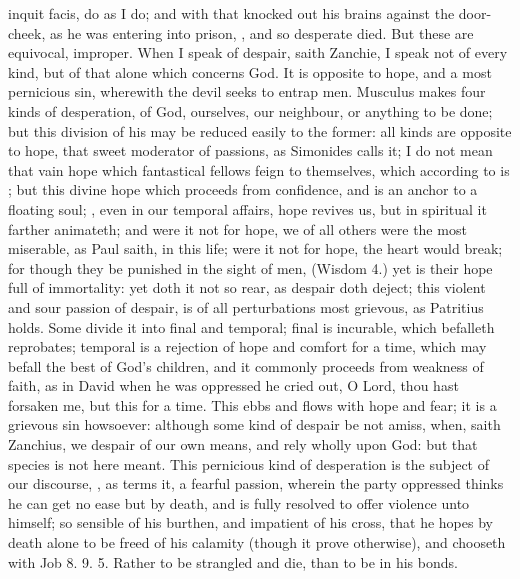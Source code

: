 {{inquit facis}, do as I do; and with that knocked out his brains against
the door-cheek, as he was entering into prison, , and so
desperate died. But these are equivocal, improper. When I speak of
despair, saith Zanchie, I speak not of every kind, but of that
alone which concerns God. It is opposite to hope, and a most pernicious
sin, wherewith the devil seeks to entrap men. Musculus makes four kinds
of desperation, of God, ourselves, our neighbour, or anything to be
done; but this division of his may be reduced easily to the former: all
kinds are opposite to hope, that sweet moderator of passions, as
Simonides calls it; I do not mean that vain hope which fantastical
fellows feign to themselves, which according to \Aristotle{} is ; but this divine hope which proceeds from
confidence, and is an anchor to a floating soul; ,
even in our temporal affairs, hope revives us, but in spiritual it
farther animateth; and were it not for hope, we of all others were the
most miserable, as Paul saith, in this life; were it not for hope, the
heart would break; for though they be punished in the sight of men,
(Wisdom  4.) yet is their hope full of immortality: yet doth it not
so rear, as despair doth deject; this violent and sour passion of
despair, is of all perturbations most grievous, as Patritius
holds. Some divide it into final and temporal; final is
incurable, which befalleth reprobates; temporal is a rejection of hope
and comfort for a time, which may befall the best of God's children,
and it commonly proceeds from weakness of faith, as in David when
he was oppressed he cried out, O Lord, thou hast forsaken me, but this
for a time. This ebbs and flows with hope and fear; it is a grievous
sin howsoever: although some kind of despair be not amiss, when, saith
Zanchius, we despair of our own means, and rely wholly upon God: but
that species is not here meant. This pernicious kind of desperation is
the subject of our discourse, , as \Austin{} terms it, a fearful passion, wherein the party
oppressed thinks he can get no ease but by death, and is fully resolved
to offer violence unto himself; so sensible of his burthen, and
impatient of his cross, that he hopes by death alone to be freed of his
calamity (though it prove otherwise), and chooseth with Job  8. 9.
 5. Rather to be strangled and die, than to be in his bonds.

}

